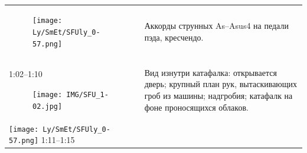 \begin{longtable}[]{@{}ll@{}}
\begin{minipage}[t]{0.32\columnwidth}\raggedright\strut
\begin{figure}
\centering
\texttt{[image: Ly/SmEt/SFUly\_0-57.png]}
\caption{}
\end{figure}
\strut
\end{minipage} & \begin{minipage}[t]{0.62\columnwidth}\raggedright\strut
Аккорды струнных As--Asus4 на педали пэда, кресчендо.\strut
\end{minipage}\tabularnewline
\begin{minipage}[t]{0.48\columnwidth}\raggedright\strut
1:02--1:10

\begin{figure}
\centering
\texttt{[image: IMG/SFU\_1-02.jpg]}
\caption{}
\end{figure}
\strut
\end{minipage} & \begin{minipage}[t]{0.48\columnwidth}\raggedright\strut
Вид изнутри катафалка: открывается дверь; крупный план
рук, вытаскивающих гроб из машины; надгробия;
катафалк на фоне проносящихся облаков.\strut
\end{minipage}\tabularnewline
\begin{minipage}[t]{0.48\columnwidth}\raggedright\strut
\texttt{[image: Ly/SmEt/SFUly\_0-57.png]}
1:11--1:15


\end{minipage}
\end{longtable}
